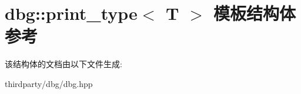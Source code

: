 \hypertarget{structdbg_1_1print__type}{}\section{dbg\+:\+:print\+\_\+type$<$ T $>$ 模板结构体 参考}
\label{structdbg_1_1print__type}


该结构体的文档由以下文件生成\+:\begin{DoxyCompactItemize}
\item 
thirdparty/dbg/dbg.\+hpp\end{DoxyCompactItemize}
